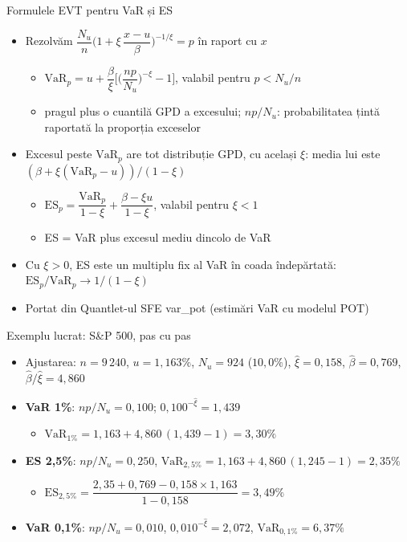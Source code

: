 \begin{frame}{Formulele EVT pentru VaR și ES}
\itemsize{\small}
\begin{itemize}
    \item Rezolvăm $\dfrac{N_u}{n}\Big(1 + \xi\,\dfrac{x - u}{\beta}\Big)^{-1/\xi} = p$ în raport cu $x$
    \begin{itemize}
        \item $\mathrm{VaR}_p = u + \dfrac{\beta}{\xi}\Big[\Big(\dfrac{n p}{N_u}\Big)^{-\xi} - 1\Big]$, valabil pentru $p < N_u/n$
        \item pragul plus o cuantilă GPD a excesului; $np/N_u$: probabilitatea țintă raportată la proporția exceselor
    \end{itemize}
    \item Excesul peste $\mathrm{VaR}_p$ are tot distribuție GPD, cu același $\xi$: media lui este $(\beta + \xi(\mathrm{VaR}_p - u))/(1 - \xi)$
    \begin{itemize}
        \item $\mathrm{ES}_p = \dfrac{\mathrm{VaR}_p}{1 - \xi} + \dfrac{\beta - \xi u}{1 - \xi}$, valabil pentru $\xi < 1$ 
        \item ES = VaR plus excesul mediu dincolo de VaR
    \end{itemize}
    \item Cu $\xi > 0$, ES este un multiplu fix al VaR în coada îndepărtată: $\mathrm{ES}_p/\mathrm{VaR}_p \to 1/(1 - \xi)$
    \item Portat din Quantlet-ul SFE var\_pot (estimări VaR cu modelul POT)
\end{itemize}
\end{frame}

\begin{frame}{Exemplu lucrat: S\&P 500, pas cu pas}
\itemsize{\small}
\begin{itemize}
    \item Ajustarea: $n = 9\,240$, $u = 1{,}163\%$, $N_u = 924$ ($10{,}0\%$), $\hat\xi = 0{,}158$, $\hat\beta = 0{,}769$, $\hat\beta/\hat\xi = 4{,}860$
    \item \textbf{VaR 1\%}: $np/N_u = 0{,}100$; $0{,}100^{-\hat\xi} = 1{,}439$
    \begin{itemize}
        \item $\mathrm{VaR}_{1\%} = 1{,}163 + 4{,}860\,(1{,}439 - 1) = 3{,}30\%$
    \end{itemize}
    \item \textbf{ES 2,5\%}: $np/N_u = 0{,}250$, $\mathrm{VaR}_{2,5\%} = 1{,}163 + 4{,}860\,(1{,}245 - 1) = 2{,}35\%$
    \begin{itemize}
        \item $\mathrm{ES}_{2,5\%} = \dfrac{2{,}35 + 0{,}769 - 0{,}158 \times 1{,}163}{1 - 0{,}158} = 3{,}49\%$
    \end{itemize}
    \item \textbf{VaR 0,1\%}: $np/N_u = 0{,}010$, $0{,}010^{-\hat\xi} = 2{,}072$, $\mathrm{VaR}_{0,1\%} = 6{,}37\%$
\end{itemize}
\end{frame}


